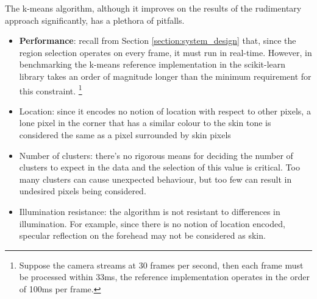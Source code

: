 

The k-means algorithm, although it improves on the results of the rudimentary approach significantly, has a plethora of pitfalls.
\begin{itemize}
    \item \textbf{Performance}: recall from Section \ref{section:system_design} that, since the region selection operates on every frame, it must run in real-time. However, in benchmarking the k-means reference implementation in the scikit-learn\cite{sklearn} library takes an order of magnitude longer than the minimum requirement for this constraint. \footnote{Suppose the camera streams at 30 frames per second, then each frame must be processed within 33ms, the reference implementation operates in the order of 100ms per frame. }
    \item Location: since it encodes no notion of location with respect to other pixels, a lone pixel in the corner that has a similar colour to the skin tone is considered the same as a pixel surrounded by skin pixels
    \item Number of clusters: there's no rigorous means for deciding the number of clusters to expect in the data and the selection of this value is critical. Too many clusters can cause unexpected behaviour, but too few can result in undesired pixels being considered. 
    \item Illumination resistance: the algorithm is not resistant to differences in illumination. For example, since there is no notion of location encoded, specular reflection on the forehead may not be considered as skin.
\end{itemize}


